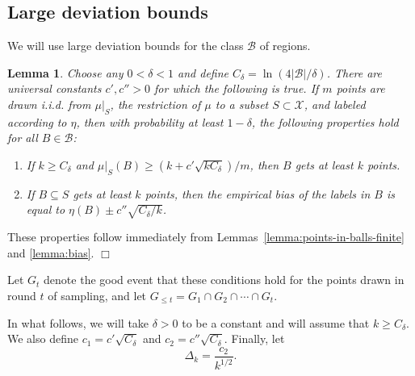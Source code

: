\documentclass{article}
\def\X{{\mathcal X}}
\def\B{{\mathcal B}}
\newtheorem{lemma}[thm]{Lemma}
\newenvironment{proof}{\noindent {\sc Proof:}}{$\Box$ \medskip}
\begin{document}
\subsection{Large deviation bounds}

We will use large deviation bounds for the class $\B$ of regions. 
\begin{lemma}
Choose any $0 < \delta < 1$ and define $C_\delta = \ln (4 |\B|/\delta)$. There are universal constants $c',c''>0$ for which the following is true. If $m$ points are drawn i.i.d. from $\mu|_S$, the restriction of $\mu$ to a subset $S \subset \X$, and labeled according to $\eta$, then with probability at least $1-\delta$, the following properties hold for all $B \in \B$:
\begin{enumerate}
\item[(a)] If $k \geq C_\delta$ and $\mu|_S(B) \geq (k + c' \sqrt{k C_\delta})/m$, then $B$ gets at least $k$ points.
\item[(b)] If $B \subseteq S$ gets at least $k$ points, then the empirical bias of the labels in $B$ is equal to $\eta(B) \pm c'' \sqrt{C_\delta/k}$.
\end{enumerate}
\label{lemma:bias-estimates}
\end{lemma}
\begin{proof}
These properties follow immediately from Lemmas~\ref{lemma:points-in-balls-finite} and \ref{lemma:bias}.
\end{proof}

Let $G_t$ denote the good event that these conditions hold for the points drawn in round $t$ of sampling, and let $G_{\leq t} = G_1 \cap G_2 \cap \cdots \cap G_t$.

In what follows, we will take $\delta > 0$ to be a constant and will assume that $k \geq C_\delta$. We also define $c_1 = c' \sqrt{C_\delta}$ and $c_2 = c'' \sqrt{C_\delta}$. Finally, let
$$ \Delta_k = \frac{c_2}{k^{1/2}}.$$
\end{document}
